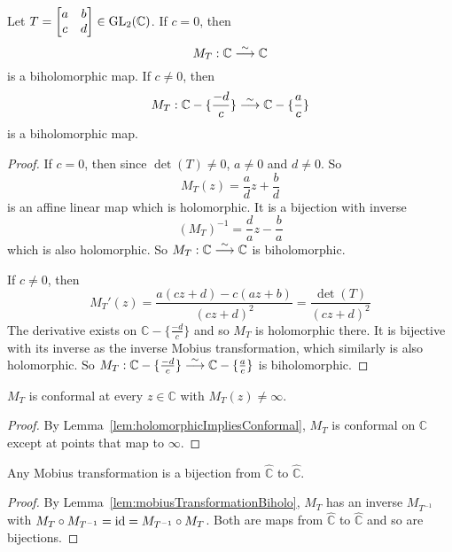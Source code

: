 \begin{lemma}\label{lem:mobiusTransformationBiholo}
	Let $T = \begin{bmatrix} a & b \\ c & d \end{bmatrix} \in \text{GL}_2(\mathbb{C})$. If $c = 0$, then
	\[
		M_T: \mathbb{C} \mathrel{\overset{\sim}{\longrightarrow}} \mathbb{C}
	\]
	is a biholomorphic map. If $c \ne 0$, then
	\[
		M_T: \mathbb{C} - \{ \frac{-d}{c} \} \mathrel{\overset{\sim}{\longrightarrow}} \mathbb{C} - \{ \frac{a}{c} \}
	\]
	is a biholomorphic map.
\end{lemma}

\begin{proof}
	If $c = 0$, then since $\det(T) \ne 0$, $a \ne 0$ and $d \ne 0$. So
	\[
		M_T(z) = \frac{a}{d} z + \frac{b}{d}
	\]
	is an affine linear map which is holomorphic. It is a bijection with inverse
	\[
		{(M_T)}^{-1} = \frac{d}{a} z - \frac{b}{a}
	\]
	which is also holomorphic. So $M_T: \mathbb{C} \mathrel{\overset{\sim}{\longrightarrow}} \mathbb{C}$ is biholomorphic.

	If $c \ne 0$, then
	\[
		M_T'(z) = \frac{a(cz + d) - c(az + b)}{{(cz + d)}^2} = \frac{\det(T)}{{(cz + d)}^2}
	\]
	The derivative exists on $\mathbb{C} - \{ \frac{-d}{c} \}$ and so $M_T$ is holomorphic there. It is bijective with its inverse as the inverse Mobius transformation, which similarly is also holomorphic. So $M_T: \mathbb{C} - \{ \frac{-d}{c} \} \mathrel{\overset{\sim}{\longrightarrow}} \mathbb{C} - \{ \frac{a}{c} \}$ is biholomorphic.
\end{proof}

\begin{corollary}
	$M_T$ is conformal at every $z \in \mathbb{C}$ with $M_T(z) \ne \infty$.
\end{corollary}

\begin{proof}
	By Lemma~\ref{lem:holomorphicImpliesConformal}, $M_T$ is conformal on $\mathbb{C}$ except at points that map to $\infty$.
\end{proof}

\begin{corollary}
	Any Mobius transformation is a bijection from $\hat{\mathbb{C}}$ to $\hat{\mathbb{C}}$.
\end{corollary}

\begin{proof}
	By Lemma~\ref{lem:mobiusTransformationBiholo}, $M_T$ has an inverse $M_{T^{-1}}$ with $M_T \circ M_{T^{-1}} = \text{id} = M_{T^{-1}} \circ M_T$. Both are maps from $\hat{\mathbb{C}}$ to $\hat{\mathbb{C}}$ and so are bijections.
\end{proof}

